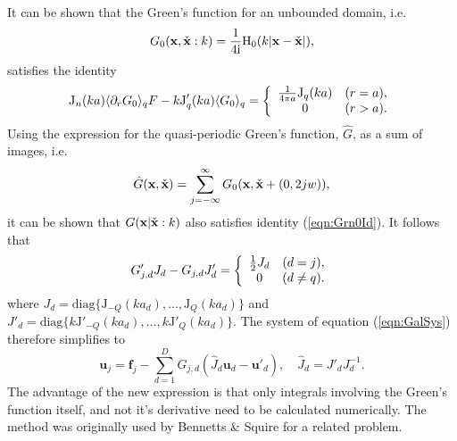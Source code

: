 \documentclass[12pt,a4paper]{article}
\newcommand{\wrt}{ ~ {\rm d}}
\newcommand{\besj}{\textrm{J}}
\newcommand{\besh}{\textrm{H}}
\newcommand{\diag}{\textrm{diag}}
\def\ci{{\mathrm i}}
\renewcommand{\exp}{{\rm e}}
\newcommand{\ie}{i.e.\ }
\newcommand{\rad}{a}
\newcommand{\bx}{{\bf x}}
\newcommand{\bxo}{\check{\textbf{x}}}
\newcommand{\bu}{\textbf{u}}
\newcommand{\bfI}{\textbf{f}}
\newcommand{\tho}{\check{\theta}}
\begin{document}
It can be shown that the Green's function for an unbounded domain, \ie
\begin{equation}
G_{0}(\bx,\bxo:k)
=
\frac{1}{4\ci}
\besh_{0}(k\vert\bx-\bxo\vert)
,
\end{equation}
satisfies the  identity
\begin{equation}\label{eqn:Grn0Id}
\besj_{n}(k\rad)
\langle
\partial_{r}
G_{0}
\rangle_{q}F
-
k\besj_{q}'(k\rad)
\langle
G_{0}
\rangle_{q}
=
\left\{
\begin{array}{c c}
\frac{1}{4\pi\rad}\besj_{q}(k\rad)
&
(r=\rad),
\\
0
&
(r>\rad).
\end{array}
\right.
\end{equation} 
Using the expression for the quasi-periodic Green's function, $\hat{G}$, as a sum of images, \ie
\begin{equation}
\hat{G}(\bx,\bxo)
=
\sum_{j=-\infty}^{\infty}
G_{0}(\bx,\bxo+(0,2jw))
,
\end{equation}
it can be shown that $G(\bx\vert\bxo:k)$ also satisfies identity (\ref{eqn:Grn0Id}).
It follows that
\begin{equation}
G_{j,d}'
J_{d}
-
G_{j,d}
J'_{d}
=
\left\{
\begin{array}{c c}
\frac{1}{2}J_{d}
&
(d=j),
\\
0
&
(d\neq q).
\end{array}
\right.
\end{equation}
where $J_{d}=\diag\{\besj_{-Q}(k\rad_{d}),\dots,\besj_{Q}(k\rad_{d})\}$ and 
$J'_{d}=\diag\{k\besj'_{-Q}(k\rad_{d}),\dots,k\besj'_{Q}(k\rad_{d})\}$.
The system of equation (\ref{eqn:GalSys}) therefore simplifies to
\begin{equation}\label{eqn:GalSys_ii}
\bu_{j}
=
\bfI_{j}
-
\sum_{d=1}^{D}
G_{j,d}
\left(
\hat{J}_{d}
\bu_{d}
-
\bu'_{d}
\right)
,
\quad
\hat{J}_{d}
=
J'_{d}J_{d}^{-1}
.
\end{equation}
The advantage of the new expression is that only integrals involving the Green's function itself, and not it's derivative need to be calculated numerically.
The method was originally used by Bennetts \& Squire \cite{Ben&Squ09b} for a related problem. 
\end{document}
